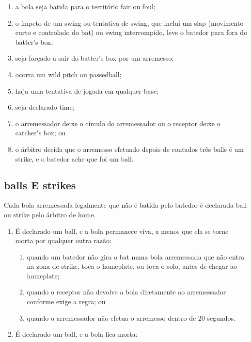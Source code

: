 \begin{multicols}{2}
\begin{enumerate}[label=\alph*)]
		\begin{enumerate}[label=\roman*.]
			\item a bola seja batida para o territ\'orio \gls{fair} ou \gls{foul}; 
			\item o \'impeto de um \gls{swing} ou tentativa de \gls{swing}, que inclui um \gls{slap} (movimento curto e controlado do \gls{bat}) ou \gls{swing} interrompido, leve o 
			batedor para fora do \gls{batter's box}; 
			\item seja for\c{c}ado a sair do \gls{batter's box} por um arremesso; 
			\item ocorra um \gls{wild pitch} ou \Gls{passedball}; 
			\item  haja uma tentativa de jogada em qualquer base; 
			\item seja declarado \gls{time}; 
			\item  o arremessador deixe o c\'irculo do arremessador ou o receptor deixe o 
			\gls{catcher's box}; ou 
			\item o \'arbitro decida que o arremesso efetuado depois de contados tr\^es \glspl{ball} \'e um \gls{strike}, e o batedor ache que foi um \gls{ball}. 
		\end{enumerate}
	\end{enumerate}
	
	\subsection{\glspl{ball} E \glspl{strike}}
	Cada bola arremessada legalmente que n\~ao \'e batida pelo batedor \'e declarada \gls{ball} ou \gls{strike} pelo \'arbitro de \gls{home}. 
	
	\begin{enumerate}[label=\alph*)]
		\item \'E declarado um \gls{ball}, e a bola permanece viva, a menos que ela se torne morta por qualquer outra raz\~ao: 
		\begin{enumerate}[label=\roman*.]
			\item quando um batedor n\~ao gira o \gls{bat} numa bola arremessada que n\~ao entra na zona de \gls{strike}, toca o \gls{homeplate}, ou toca o solo, antes de chegar ao \gls{homeplate}; 
			\item quando o receptor n\~ao devolve a bola diretamente ao arremessador conforme exige a regra; ou 
			\item  quando o arremessador n\~ao efetua o arremesso dentro de 20 segundos. 
		\end{enumerate}
		\item  \'E declarado um \gls{ball}, e a bola fica morta: 
		

\end{enumerate}
\end{multicols}
